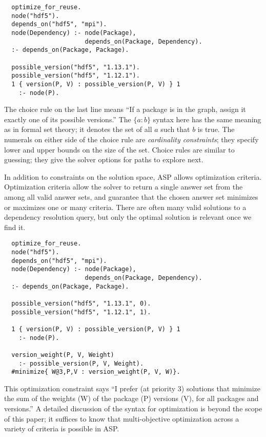 \begin{verbatim}
  optimize_for_reuse.
  node("hdf5").
  depends_on("hdf5", "mpi").
  node(Dependency) :- node(Package),
                      depends_on(Package, Dependency).
  :- depends_on(Package, Package).

  possible_version("hdf5", "1.13.1").
  possible_version("hdf5", "1.12.1").
  1 { version(P, V) : possible_version(P, V) } 1
    :- node(P).
\end{verbatim}

The choice rule on the last line means ``If a package is in the graph, assign it
exactly one of its possible versions.'' The $\{a:b\}$ syntax here has the same meaning
as in formal set theory; it denotes the set of all $a$ such that $b$ is true. The
numerals on either side of the choice rule are {\it cardinality constraints}; they specify
lower and upper bounds on the size of the set. Choice rules are similar to guessing;
they give the solver options for paths to explore next.


In addition to constraints on the solution space, ASP allows optimization criteria.
Optimization criteria allow the solver to return a single answer set from the among all
valid answer sets, and guarantee that the chosen answer set minimizes or maximizes one
or many criteria. There are often many valid solutions to a dependency resolution query,
but only the optimal solution is relevant once we find it.

\begin{verbatim}
  optimize_for_reuse.
  node("hdf5").
  depends_on("hdf5", "mpi").
  node(Dependency) :- node(Package),
                      depends_on(Package, Dependency).
  :- depends_on(Package, Package).

  possible_version("hdf5", "1.13.1", 0).
  possible_version("hdf5", "1.12.1", 1).

  1 { version(P, V) : possible_version(P, V) } 1
    :- node(P).

  version_weight(P, V, Weight)
    :- possible_version(P, V, Weight).
  #minimize{ W@3,P,V : version_weight(P, V, W)}.
\end{verbatim}

This optimization constraint says ``I prefer (at priority 3) solutions that minimize the
sum of the weights (W) of the package (P) versions (V), for all packages and versions.''
A detailed discussion of the syntax for optimization is beyond the scope of this paper;
it suffices to know that multi-objective optimization across a variety of criteria is
possible in ASP.


